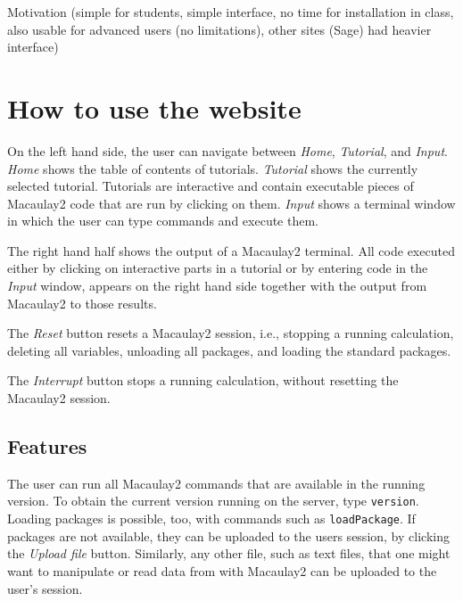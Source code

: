 \documentclass[]{article}
\begin{document}
Motivation (simple for students, simple interface, no time for installation in class, also usable for advanced users (no limitations), other sites (Sage) had heavier interface)
\section{How to use the website}




On the left hand side, the user can navigate between {\it Home}, {\it Tutorial}, and {\it Input}. {\it Home} shows the table of contents of tutorials. {\it Tutorial} shows the currently selected tutorial. Tutorials are interactive and contain executable pieces of Macaulay2 code that are run by clicking on them. {\it Input} shows a terminal window in which the user can type commands and execute them.  

The right hand half shows the output of a Macaulay2 terminal. All code executed either by clicking on interactive parts in a tutorial or by entering code in the {\it Input} window, appears on the right hand side together with the output from Macaulay2 to those results. 

The {\it Reset} button resets a Macaulay2 session, i.e., stopping a running calculation, deleting all variables, unloading all packages, and loading the standard packages. 

The {\it Interrupt} button stops a running calculation, without resetting the Macaulay2 session. 

\subsection{Features}
The user can run all Macaulay2 commands that are available in the running version. To obtain the current version running on the server, type {\tt version}. Loading packages is possible, too, with commands such as {\tt loadPackage}. If packages are not available, they can be uploaded to the users session, by clicking the {\it Upload file} button. Similarly, any other file, such as text files, that one might want to manipulate or read data from with Macaulay2 can be uploaded to the user's session. 
\end{document}
